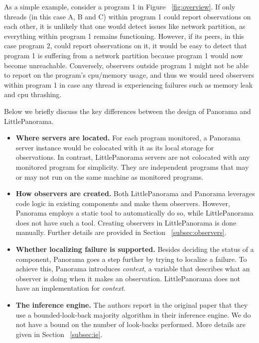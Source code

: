 As a simple example, consider a program 1 in Figure ~\ref{fig:overview}. If only threads (in this case A, B and C) within program 1 could report observations on each other, it is unlikely that one would detect issues like network partition, as everything within program 1 remains functioning. However, if its peers, in this case program 2, could report observations on it, it would be easy to detect that program 1 is suffering from a network partition because program 1 would now become unreachable. Conversely, observers outside program 1 might not be able to report on the program's cpu/memory usage, and thus we would need observers within program 1 in case any thread is experiencing failures such as memory leak and cpu thrashing. 

Below we briefly discuss the key differences between the design of Panorama and LittlePanorama. 
\begin{itemize}
    \item \textbf{Where servers are located.} For each program monitored, a Panorama server instance would be colocated with it as its local storage for observations. In contrast, LittlePanorama servers are not colocated with any monitored program for simplicity. They are independent programs that may or may not run on the same machine as monitored programs.
    \item \textbf{How observers are created.} Both LittlePanorama and Panorama leverages code logic in existing components and make them observers. However, Panorama employs a static tool to automatically do so, while LittlePanorama does not have such a tool. Creating observers in LittlePanorama is done manually. Further details are provided in Section ~\ref{subsec:observers}.
    \item \textbf{Whether localizing failure is supported.} Besides deciding the status of a component, Panorama goes a step further by trying to localize a failure. To achieve this, Panorama introduces \textit{context}, a variable that describes what an observer is doing when it makes an observation. LittlePanorama does not have an implementation for \textit{context}.
    \item \textbf{The inference engine.} The authors report in the original paper that they use a bounded-look-back majority algorithm in their inference engine. We do not have a bound on the number of look-backs performed. More details are given in Section ~\ref{subsec:ie}.
\end{itemize}

